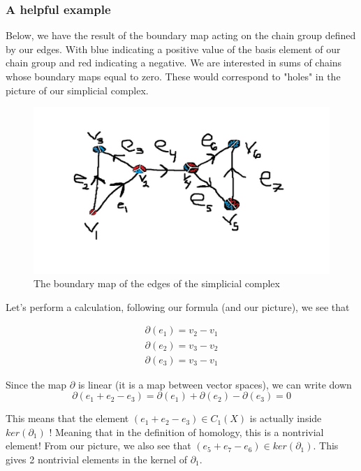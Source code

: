 \documentclass[12pt]{article}
\theoremstyle{plain}
\theoremstyle{definition}
\begin{document}
\subsubsection{A helpful example}

Below, we have the result of the boundary map acting on the chain group defined by 
our edges. With blue indicating a positive value of the basis element of our chain 
group and red indicating a negative. We are interested in sums of chains whose boundary
maps equal to zero. These would correspond to "holes" in the picture of our simplicial complex.


\begin{figure}[ht]
  \begin{center}
      \includegraphics[scale = .4]{Colored_Cx.jpg}
  \end{center}
\caption{The boundary map of the edges of the simplicial complex}
\end{figure}

Let's perform a calculation, following our formula (and our picture), we see that

\begin{align*}
\partial(e_1) = v_2 - v_1 \\
\partial(e_2) = v_3 - v_2 \\
\partial(e_3) = v_3 - v_1
\end{align*}

Since the map $\partial$ is linear (it is a map between vector spaces), we can write
down 
\begin{equation*}
\partial(e_1 + e_2 - e_3) = \partial(e_1) + \partial(e_2) - \partial(e_3) = 0
\end{equation*}

This means that the element $(e_1 + e_2 - e_3) \in C_1(X)$ is actually inside $ker(\partial_1)$ !
Meaning that in the definition of homology, this is a nontrivial element! From our picture, we also
see that $(e_5 + e_7 - e_6) \in ker(\partial_1)$. This gives 2 nontrivial elements in the kernel of $\partial_1$.
\end{document}

